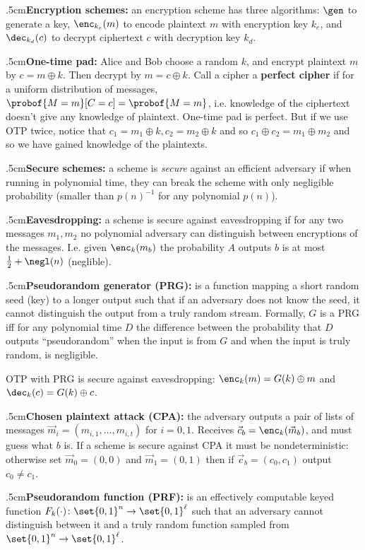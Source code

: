 \quitvmode\kern.5cm{\bf Encryption schemes:} an encryption scheme has three algorithms: $\gen$ to generate a key, $\enc_{k_e}(m)$ to encode plaintext $m$ with encryption key $k_e$, and $\dec_{k_d}(c)$ to
decrypt ciphertext $c$ with decryption key $k_d$.

\quitvmode\kern.5cm{\bf One-time pad:} Alice and Bob choose a random $k$, and encrypt plaintext $m$ by $c=m\oplus k$.
Then decrypt by $m=c\oplus k$.
Call a cipher a {\bf perfect cipher} if for a uniform distribution of messages, $\probof{M=m}[C=c]=\probof{M=m}$, i.e. knowledge of the ciphertext doesn't give any knowledge of plaintext.
One-time pad is perfect.
But if we use OTP twice, notice that $c_1=m_1\oplus k,c_2=m_2\oplus k$ and so $c_1\oplus c_2=m_1\oplus m_2$ and so we have gained knowledge of the plaintexts.

\quitvmode\kern.5cm{\bf Secure schemes:} a scheme is {\it secure} against an efficient adversary if when running in polynomial time, they can break the scheme with only negligible probability (smaller than
$p(n)^{-1}$ for any polynomial $p(n)$).

\quitvmode\kern.5cm{\bf Eavesdropping:} a scheme is secure against eavesdropping if for any two messages $m_1,m_2$ no polynomial adversary can distinguish between encryptions of the messages.
I.e. given $\enc_k(m_b)$ the probability $A$ outputs $b$ is at most $\frac12+\negl(n)$ (neglible).

\quitvmode\kern.5cm{\bf Pseudorandom generator (PRG):} is a function mapping a short random seed (key) to a longer output such that if an adversary does not know the seed, it cannot distinguish the output
from a truly random stream.
Formally, $G$ is a PRG iff for any polynomial time $D$ the difference between the probability that $D$ outputs ``pseudorandom'' when the input is from $G$ and when the input is truly random, is negligible.

OTP with PRG is secure against eavesdropping: $\enc_k(m)=G(k)\oplus m$ and $\dec_k(c)=G(k)\oplus c$.

\quitvmode\kern.5cm{\bf Chosen plaintext attack (CPA):} the adversary outputs a pair of lists of messages $\vec m_i=(m_{i,1},\dots,m_{i,t})$ for $i=0,1$.
Receives $\vec c_b=\enc_k(\vec m_b)$, and must guess what $b$ is.
If a scheme is secure against CPA it must be nondeterministic: otherwise set $\vec m_0=(0,0)$ and $\vec m_1=(0,1)$ then if $\vec c_b=(c_0,c_1)$ output $c_0\neq c_1$.

\quitvmode\kern.5cm{\bf Pseudorandom function (PRF):} is an effectively computable keyed function $F_k(\cdot)\colon\set{0,1}^n\to\set{0,1}^\ell$ such that an adversary cannot distinguish between it and
a truly random function sampled from $\set{0,1}^n\to\set{0,1}^\ell$.

